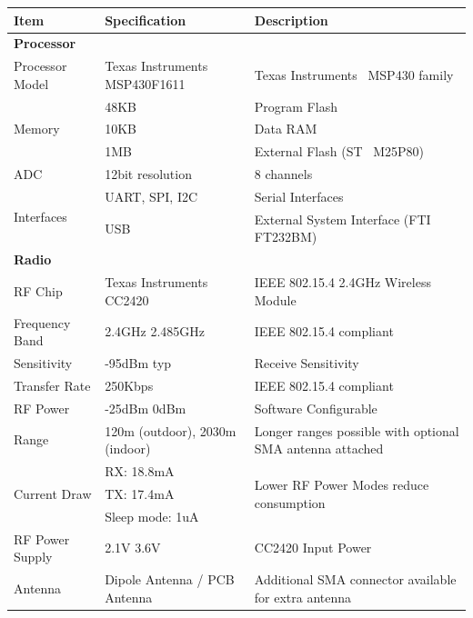 \begin{table}[H]
	\centering
	\begin{tabular}{| l | l | p{5.5cm} |}
	\hline
	\textbf{Item} & \textbf{Specification} & \textbf{Description} \\
	\hline
	\hline

	\multicolumn{3}{|l|}{\textbf{Processor}} \\
	\hline
	Processor Model & Texas Instruments\textregistered~ MSP430F1611 & Texas Instruments\textregistered~ MSP430 family\\
	\hline
	\multirow{3}{*}{Memory} & 48KB & Program Flash \\
	~ & 10KB & Data RAM \\
	~ & 1MB & External Flash (ST\textregistered~ M25P80) \\
	\hline
	ADC & 12bit resolution & 8 channels \\
	\hline
	\multirow{2}{*}{Interfaces} & UART, SPI, I2C & Serial Interfaces \\
	~ & USB & External System Interface (FTI\textregistered~ FT232BM) \\
	\hline
	\hline

	\multicolumn{3}{|l|}{\textbf{Radio}} \\
	\hline
	RF Chip & Texas Instruments\textregistered~ CC2420 & IEEE 802.15.4 2.4GHz Wireless Module\\
	\hline
	Frequency Band & 2.4GHz \mytilde 2.485GHz & IEEE 802.15.4 compliant \\
	\hline
	Sensitivity & -95dBm typ & Receive Sensitivity \\
	\hline
	Transfer Rate & 250Kbps & IEEE 802.15.4 compliant \\
	\hline
	RF Power & -25dBm \mytilde 0dBm & Software Configurable \\
	\hline
	Range & \mytilde120m (outdoor), 20\mytilde30m (indoor) & Longer ranges possible with optional SMA antenna attached \\
	\hline
	\multirow{3}{*}{Current Draw} & RX: 18.8mA & \multirow{3}{5.5cm}{Lower RF Power Modes reduce consumption} \\
	~ & TX: 17.4mA & ~ \\
	~ & Sleep mode: 1uA & ~ \\
	\hline
	RF Power Supply & 2.1V \mytilde 3.6V & CC2420 Input Power \\
	\hline
	Antenna & Dipole Antenna / PCB Antenna & Additional SMA connector available for extra antenna \\
	\hline
	\hline


\end{tabular}
\end{table}
